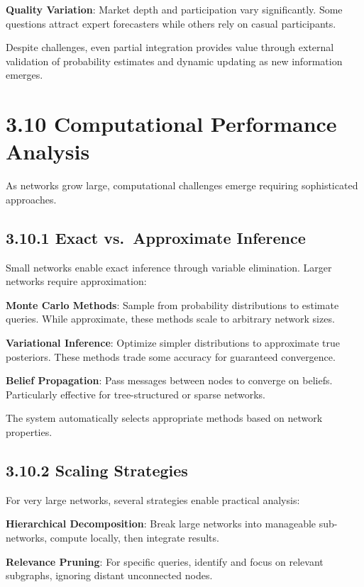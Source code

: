 \documentclass[
  11pt,
  letterpaper,
]{book}
\begin{document}
\textbf{Quality Variation}: Market depth and participation vary
significantly. Some questions attract expert forecasters while others
rely on casual participants.

Despite challenges, even partial integration provides value through
external validation of probability estimates and dynamic updating as new
information emerges.

\section{3.10 Computational Performance
Analysis}\label{sec-computational-performance}

As networks grow large, computational challenges emerge requiring
sophisticated approaches.

\subsection{3.10.1 Exact vs.~Approximate
Inference}\label{sec-exact-approximate}

Small networks enable exact inference through variable elimination.
Larger networks require approximation:

\textbf{Monte Carlo Methods}: Sample from probability distributions to
estimate queries. While approximate, these methods scale to arbitrary
network sizes.

\textbf{Variational Inference}: Optimize simpler distributions to
approximate true posteriors. These methods trade some accuracy for
guaranteed convergence.

\textbf{Belief Propagation}: Pass messages between nodes to converge on
beliefs. Particularly effective for tree-structured or sparse networks.

The system automatically selects appropriate methods based on network
properties.

\subsection{3.10.2 Scaling Strategies}\label{sec-scaling-strategies}

For very large networks, several strategies enable practical analysis:

\textbf{Hierarchical Decomposition}: Break large networks into
manageable sub-networks, compute locally, then integrate results.

\textbf{Relevance Pruning}: For specific queries, identify and focus on
relevant subgraphs, ignoring distant unconnected nodes.
\end{document}
